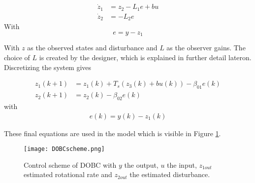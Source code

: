 \begin{equation} \label{eq:attobs}
\begin{aligned}
\dot{z}_1 &=z_2-L_1e +bu\\
\dot{z}_2 &= -L_2e
\end{aligned}
\end{equation}
With 
\begin{equation}
e=y-z_1
\end{equation}

With $z$ as the observed states and disturbance and $L$ as the observer gains. The choice of $L$ is created by the designer, which is explained in further detail lateron. Discretizing the system gives 

\begin{equation}
\begin{aligned}
z_1(k+1) &= z_1(k)+T_s\left(z_3(k)+bu(k)\right) - \beta_{01}e(k)\\
z_2(k+1) &= z_2(k)-\beta_{02}e(k) 
\end{aligned}
\end{equation}
with 
\begin{equation}
\begin{aligned}
e(k) = y(k)-z_1(k)
\end{aligned}
\end{equation}

These final equations are used in the model which is visible in Figure \ref{fig:DOBCscheme}.

\begin{figure}[H]
\centering
\texttt{[image: DOBCscheme.png]}
\caption{Control scheme of DOBC with $y$ the output, $u$ the input, $z_{1out}$ estimated rotational rate and $z_{2out}$ the estimated disturbance.}
\label{fig:DOBCscheme}
\end{figure}

